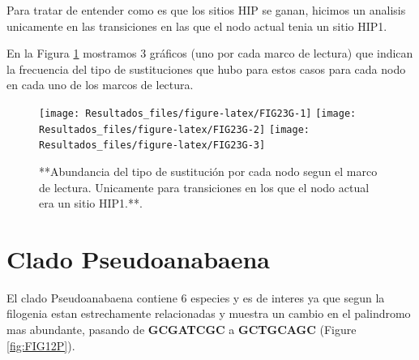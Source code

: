 \documentclass[
]{book}
\begin{document}
Para tratar de entender como es que los sitios HIP se ganan, hicimos un analisis unicamente en las transiciones en las que el nodo actual tenia un sitio HIP1.

En la Figura \ref{fig:FIG23G} mostramos 3 gráficos (uno por cada marco de lectura) que indican la frecuencia del tipo de sustituciones que hubo para estos casos para cada nodo en cada uno de los marcos de lectura.

\begin{figure}

{\centering \texttt{[image: Resultados\_files/figure-latex/FIG23G-1]} \texttt{[image: Resultados\_files/figure-latex/FIG23G-2]} \texttt{[image: Resultados\_files/figure-latex/FIG23G-3]} 

}

\caption{**Abundancia del tipo de sustitución por cada nodo segun el marco de lectura. Unicamente para transiciones en los que el nodo actual era un sitio HIP1.**.}\label{fig:FIG23G}
\end{figure}

\hypertarget{clado-pseudoanabaena}{%
\section{Clado Pseudoanabaena}\label{clado-pseudoanabaena}}

El clado Pseudoanabaena contiene 6 especies y es de interes ya que segun la filogenia estan estrechamente relacionadas y muestra un cambio en el palindromo mas abundante, pasando de \textbf{GCGATCGC} a \textbf{GCTGCAGC} (Figure \ref{fig:FIG12P}).
\end{document}
